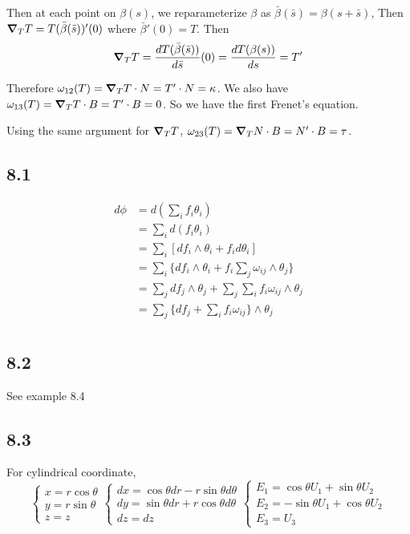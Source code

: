 \documentclass[12pt]{article}
\begin{document}
 Then at each point on $\beta(s)$, we reparameterize $\beta$ as $\bar{\beta}(\bar{s}) = \beta(s + \bar{s})$, Then $\grad_T T = T(\bar{\beta}(\bar{s}))'(0)$ where $\bar{\beta}'(0) = T$. Then
 $$ \grad_T T = \frac{dT(\bar{\beta}(\bar{s}))}{d\bar{s}}(0) = \frac{dT(\beta(s))}{ds} = T' $$
 
 Therefore $\omega_{12} (T) = \grad_T T \cdot N = T' \cdot N = \kappa$. We also have $\omega_{13}(T) = \grad_T T \cdot B = T' \cdot B = 0$. So we have the first Frenet's equation.
 
 Using the same argument for $\grad_TT$, $\omega_{23}(T) = \grad_T N \cdot B = N' \cdot B = \tau$. 


\subsection*{8.1}
$$\begin{aligned}
	d\phi &= d(\sum_i f_i \theta_i) \\
	      &= \sum_i d(f_i \theta_i) \\
	      &= \sum_i [df_i \wedge \theta_i + f_i d\theta_i] \\
	      &= \sum_i \{df_i \wedge \theta_i + f_i \sum_j \omega_{ij}\wedge \theta_j \} \\
	      &= \sum_j df_j \wedge \theta_j + \sum_j \sum_i f_i  \omega_{ij}\wedge \theta_j  \\
	      &= \sum_j \{df_j + \sum_i f_i  \omega_{ij} \} \wedge \theta_j \\
\end{aligned}
$$

\subsection*{8.2}
See example 8.4

\subsection*{8.3}
For cylindrical coordinate, 
$$\begin{cases}
	x = r \cos \theta \\
	y = r \sin\theta \\
	z = z
\end{cases}
\begin{cases}
	dx = \cos\theta dr - r\sin\theta d\theta \\
	dy = \sin\theta dr + r\cos\theta d\theta \\
	dz = dz
\end{cases}
\begin{cases}
	E_1 = \cos\theta U_1 + \sin\theta U_2 \\
	E_2 = -\sin\theta U_1 + \cos\theta U_2 \\
	E_3 = U_3 
\end{cases}
$$
\end{document}
